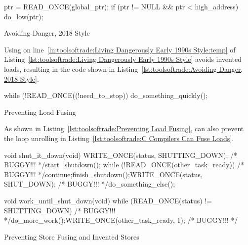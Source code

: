 \begin{listing}[tbp]
\begin{linelabel}
\begin{VerbatimL}[commandchars=\\\{\}]
ptr = READ_ONCE(global_ptr);
if (ptr != NULL && ptr < high_address)
	do_low(ptr);
\end{VerbatimL}
\end{linelabel}
\caption{Avoiding Danger, 2018 Style}
\label{lst:toolsoftrade:Avoiding Danger, 2018 Style}
\end{listing}

Using  on
line~\ref{ln:toolsoftrade:Living Dangerously Early 1990s Style:temp} of
Listing~\ref{lst:toolsoftrade:Living Dangerously Early 1990s Style}
avoids invented loads,
resulting in the code shown in
Listing~\ref{lst:toolsoftrade:Avoiding Danger, 2018 Style}.

\begin{listing}[tbp]
\begin{linelabel}
\begin{VerbatimL}[commandchars=\\\{\}]
while (!READ_ONCE((!need_to_stop))
	do_something_quickly();
\end{VerbatimL}
\end{linelabel}
\caption{Preventing Load Fusing}
\label{lst:toolsoftrade:Preventing Load Fusing}
\end{listing}

As shown in
Listing~\ref{lst:toolsoftrade:Preventing Load Fusing},
 can also prevent the loop unrolling in
Listing~\ref{lst:toolsoftrade:C Compilers Can Fuse Loads}.

\begin{listing}[tbp]
\begin{linelabel}
\begin{VerbatimL}[commandchars=\\\[\]]
void shut_it_down(void)
{
	WRITE_ONCE(status, SHUTTING_DOWN); /* BUGGY!!! */\lnlbl[store:a]
	start_shutdown();
	while (!READ_ONCE(other_task_ready)) /* BUGGY!!! */\lnlbl[loop:b]
		continue;\lnlbl[loop:e]
	finish_shutdown();\lnlbl[finish]
	WRITE_ONCE(status, SHUT_DOWN); /* BUGGY!!! */\lnlbl[store:b]
	do_something_else();
}

void work_until_shut_down(void)
{
	while (READ_ONCE(status) != SHUTTING_DOWN) /* BUGGY!!! */
		do_more_work();
	WRITE_ONCE(other_task_ready, 1); /* BUGGY!!! */
}
\end{VerbatimL}
\end{linelabel}
\caption{Preventing Store Fusing and Invented Stores}
\label{lst:toolsoftrade:Preventing Store Fusing and Invented Stores}
\end{listing}

